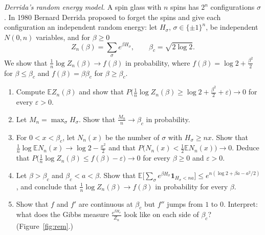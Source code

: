 \begin{exercise}[Journey]\label{pb:rem}
\emph{Derrida's random energy model.} A spin glass with $n$ spins has $2^n$ configurations $\sigma$. In 1980 Bernard Derrida proposed to forget the spins and give each
configuration an independent random energy: let $H_\sigma$, $\sigma\in\{\pm1\}^n$, be independent $N(0,n)$ variables, and for $\beta\ge0$
\[
Z_n(\beta)=\sum_\sigma e^{\beta H_\sigma},\qquad\beta_c=\sqrt{2\log2}.
\]
We show that $\frac1n\log Z_n(\beta)\to f(\beta)$ in probability, where $f(\beta)=\log2+\frac{\beta^2}2$ for $\beta\le\beta_c$ and $f(\beta)=\beta\beta_c$ for $\beta\ge\beta_c$.
\begin{enumerate}[label=(\alph*)]
\item Compute $\mathbb EZ_n(\beta)$ and show that $P\bigl(\frac1n\log Z_n(\beta)\ge\log2+\frac{\beta^2}2+\varepsilon\bigr)\to0$ for every $\varepsilon>0$.
\item Let $M_n=\max_\sigma H_\sigma$. Show that $\frac{M_n}n\to\beta_c$ in probability.
\item For $0<x<\beta_c$, let $N_n(x)$ be the number of $\sigma$ with $H_\sigma\ge nx$. Show that $\frac1n\log\mathbb EN_n(x)\to\log2-\frac{x^2}2$ and that $P\bigl(N_n(x)<\frac12\mathbb EN_n(x)\bigr)\to0$.
Deduce that $P\bigl(\frac1n\log Z_n(\beta)\le f(\beta)-\varepsilon\bigr)\to0$ for every $\beta\ge0$ and $\varepsilon>0$.
\item Let $\beta>\beta_c$ and $\beta_c<a<\beta$. Show that $\mathbb E\bigl[\sum_\sigma e^{\beta H_\sigma}\mathbf 1_{H_\sigma<na}\bigr]\le e^{n(\log2+\beta a-a^2/2)}$, and conclude that
$\frac1n\log Z_n(\beta)\to f(\beta)$ in probability for every $\beta$.
\item Show that $f$ and $f'$ are continuous at $\beta_c$ but $f''$ jumps from $1$ to $0$. Interpret: what does the Gibbs measure $\frac{e^{\beta H_\sigma}}{Z_n}$ look like
on each side of $\beta_c$? (Figure~\ref{fig:rem}.)
\end{enumerate}
\end{exercise}

